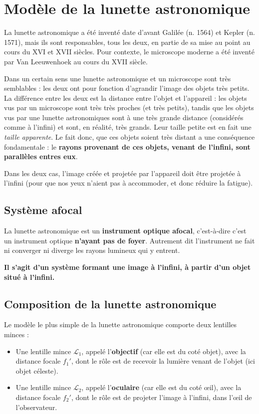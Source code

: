 \documentclass[11pt,a4paper]{article}
\begin{document}
\section{Modèle de la lunette astronomique}
La lunette astronomique a été inventé date d'avant Galilée (n. 1564) et Kepler (n. 1571), mais ils sont responsables, tous les deux, en partie de sa mise au point au cours du XVI et XVII siècles. Pour contexte, le microscope moderne a été inventé par Van Leeuwenhoek au cours du XVII siècle. 

Dans un certain sens une lunette astronomique et un microscope sont très semblables : les deux ont pour fonction d'agrandir l'image des objets très petits. La différence entre les deux est la distance entre l'objet et l'appareil : les objets vus par un microscope sont très très proches (et très petits), tandis que les objets vus par une lunette astronomiques sont à une très grande distance (considérés comme à l'infini) et sont, en réalité, très grands. Leur taille petite est en fait une \textit{taille apparente}. Le fait donc, que ces objets soient très distant a une conséquence fondamentale : le \textbf{rayons provenant de ces objets, venant de l'infini, sont parallèles entres eux}. 

Dans les deux cas, l'image créée et projetée par l'appareil doit être projetée à l'infini (pour que nos yeux n'aient pas à accommoder, et donc réduire la fatigue).  

\subsection{Système afocal}
La lunette astronomique est un \textbf{instrument optique afocal}, c'est-à-dire c'est un instrument optique \textbf{n'ayant pas de foyer}. Autrement dit l'instrument ne fait ni converger ni diverge les rayons lumineux qui y entrent. 

\textbf{Il s'agit d'un système formant une image à l'infini, à partir d'un objet situé à l'infini.} 

\subsection{Composition de la lunette astronomique}

Le modèle le plus simple de la lunette astronomique comporte deux lentilles minces : 
\begin{itemize}
    \item Une lentille mince $\mathcal{L}_1$, appelé l'\textbf{objectif} (car elle est du coté objet), avec la distance focale $f_1'$, dont le rôle est de recevoir la lumière venant de l'objet (ici objet céleste). 
    \item Une lentille mince $\mathcal{L}_2$, appelé l'\textbf{oculaire} (car elle est du coté \oe il), avec la distance focale $f_2'$, dont le rôle est de projeter l'image à l'infini, dans l'\oe il de l'observateur. 
\end{itemize}
\end{document}
